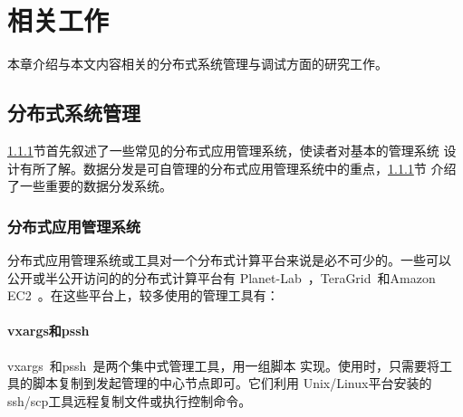 \chapter{相关工作}
\label{chap:related}

本章介绍与本文内容相关的分布式系统管理与调试方面的研究工作。




\section{分布式系统管理}

\ref{}节首先叙述了一些常见的分布式应用管理系统，使读者对基本的管理系统
设计有所了解。数据分发是可自管理的分布式应用管理系统中的重点，\ref{}节
介绍了一些重要的数据分发系统。


% 
% 
% 
% 
% 
% 

\subsection{分布式应用管理系统}

分布式应用管理系统或工具对一个分布式计算平台来说是必不可少的。一些可以
公开或半公开访问的的分布式计算平台有
Planet-Lab~\cite{Bavier2004}，TeraGrid~\cite{Catlett2002}和Amazon
EC2~\cite{Garfinkel2007}。在这些平台上，较多使用的管理工具有：

\subsubsection*{vxargs和pssh}

vxargs~\cite{vxargs}和pssh~\cite{pssh}是两个集中式管理工具，用一组脚本
实现。使用时，只需要将工具的脚本复制到发起管理的中心节点即可。它们利用
Unix/Linux平台安装的ssh/scp工具远程复制文件或执行控制命令。

